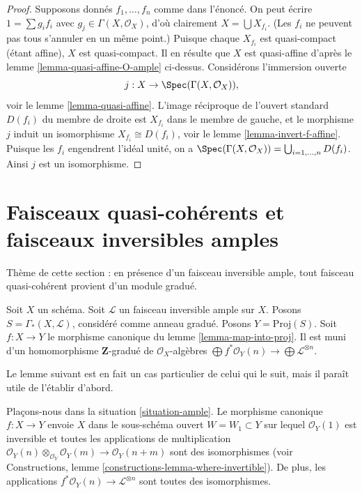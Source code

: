 \begin{proof}
Supposons donnés $f_1, \ldots, f_n$ comme dans l'énoncé.
On peut écrire $1 = \sum g_i f_i$ avec $g_j \in \Gamma(X, \mathcal{O}_X)$,
d'où clairement $X = \bigcup X_{f_i}$. (Les $f_i$ ne peuvent
pas tous s'annuler en un même point.) Puisque chaque $X_{f_i}$
est quasi-compact (étant affine), $X$ est quasi-compact.
Il en résulte que $X$ est quasi-affine d'après le
lemme \ref{lemma-quasi-affine-O-ample} ci-dessus.
Considérons l'immersion ouverte
$$
j : X \to \Spec(\Gamma(X, \mathcal{O}_X)),
$$
voir le lemme \ref{lemma-quasi-affine}. L'image réciproque de l'ouvert standard
$D(f_i)$ du membre de droite est $X_{f_i}$ dans le
membre de gauche, et le morphisme $j$ induit un isomorphisme
$X_{f_i} \cong D(f_i)$, voir le
lemme \ref{lemma-invert-f-affine}. Puisque les $f_i$ engendrent l'idéal unité,
on a $\Spec(\Gamma(X, \mathcal{O}_X))
= \bigcup_{i = 1, \ldots, n} D(f_i)$. Ainsi $j$ est un isomorphisme.
\end{proof}


\section{Faisceaux quasi-cohérents et faisceaux inversibles amples}
\label{section-ample-quasi-coherent}

\noindent
Thème de cette section : en présence d'un faisceau inversible ample,
tout faisceau quasi-cohérent provient d'un module gradué.

\begin{situation}
\label{situation-ample}
Soit $X$ un schéma.
Soit $\mathcal{L}$ un faisceau inversible ample sur $X$.
Posons $S = \Gamma_*(X, \mathcal{L})$, considéré comme anneau gradué.
Posons $Y = \text{Proj}(S)$.
Soit $f : X \to Y$ le morphisme canonique du lemme \ref{lemma-map-into-proj}.
Il est muni d'un homomorphisme $\mathbf{Z}$-gradué de $\mathcal{O}_X$-algèbres
$\bigoplus f^*\mathcal{O}_Y(n) \to \bigoplus \mathcal{L}^{\otimes n}$.
\end{situation}

\noindent
Le lemme suivant est en fait un cas particulier de celui qui le suit,
mais il paraît utile de l'établir d'abord.

\begin{lemma}
\label{lemma-ample-gcd-is-one}
Plaçons-nous dans la situation \ref{situation-ample}.
Le morphisme canonique $f : X \to Y$
envoie $X$ dans le sous-schéma ouvert $W = W_1 \subset Y$
sur lequel $\mathcal{O}_Y(1)$ est inversible et toutes
les applications de multiplication
$\mathcal{O}_Y(n) \otimes_{\mathcal{O}_Y} \mathcal{O}_Y(m) \to
\mathcal{O}_Y(n + m)$
sont des isomorphismes (voir
Constructions, lemme \ref{constructions-lemma-where-invertible}).
De plus, les applications $f^*\mathcal{O}_Y(n) \to \mathcal{L}^{\otimes n}$
sont toutes des isomorphismes.
\end{lemma}

